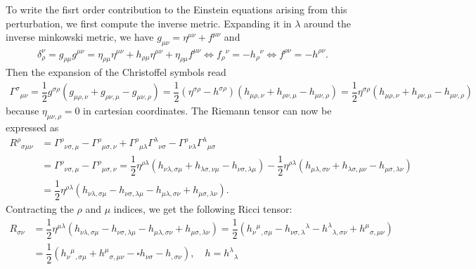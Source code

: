 \documentclass[10pt, a4paper]{article}
\begin{document}
{To write the fisrt order contribution to the Einstein equations arising from this perturbation, we first compute the inverse metric. Expanding it in $\lambda$ around the inverse minkowski metric, we have $g_{\mu\nu} = \eta^{\mu \nu} + f^{\mu \nu}$ and 
\begin{align*}
 \delta_{\rho}^{\nu} = g_{\rho \mu} g^{\mu\nu} = \eta_{\rho \mu}\eta^{\mu \nu} + h_{\rho \mu} \eta^{\mu \nu} + \eta_{\rho \mu} f^{\mu \nu} \iff f_\rho{}^{\nu} = -h_{\rho}{}^{\nu} \iff f^{\rho\nu} = -h^{\rho\nu}. 
\end{align*}
Then the expansion of the Christoffel symbols read
\begin{align*}
  \Gamma^{\sigma}{}_{\mu\nu} = \dfrac{1}{2}g^{\sigma \rho}(g_{\mu \rho, \nu}+g_{\rho \nu, \mu}-g_{\mu \nu, \rho}) = \dfrac{1}{2}(\eta^{\sigma \rho}-h^{\sigma \rho})(h_{\mu \rho, \nu}+h_{\rho \nu, \mu}-h_{\mu \nu, \rho}) = \dfrac{1}{2}\eta^{\sigma \rho}(h_{\mu \rho, \nu}+h_{\rho \nu, \mu}-h_{\mu \nu, \rho})
\end{align*}
because $\eta_{\mu\nu, \rho} = 0$ in cartesian coordinates. The Riemann tensor can now be expressed as 
\begin{align*}
  R^{\rho}{}_{\sigma\mu\nu} &= \Gamma^{\rho}{}_{\nu\sigma, \mu} - \Gamma^{\rho}{}_{\mu\sigma, \nu} + \Gamma^{\rho}{}_{\mu\lambda}\Gamma^{\lambda}{}_{\nu\sigma} - \Gamma^{\rho}{}_{\nu\lambda}\Gamma^{\lambda}{}_{\mu\sigma}\\ &= \Gamma^{\rho}{}_{\nu\sigma, \mu} - \Gamma^{\rho}{}_{\mu\sigma, \nu} = \dfrac{1}{2}\eta^{\rho \lambda}(h_{\nu \lambda, \sigma \mu}+h_{\lambda \sigma, \nu \mu}-h_{\nu \sigma, \lambda \mu}) - \dfrac{1}{2}\eta^{\rho \lambda}(h_{\mu \lambda, \sigma \nu}+h_{\lambda \sigma, \mu \nu}-h_{\mu \sigma, \lambda \nu})\\
  &= \dfrac{1}{2}\eta^{\rho \lambda}(h_{\nu \lambda, \sigma \mu}-h_{\nu \sigma, \lambda \mu} - h_{\mu \lambda, \sigma \nu} + h_{\mu \sigma, \lambda \nu}).
\end{align*}
Contracting the $\rho$ and $\mu$ indices, we get the following Ricci tensor:
\begin{align*}
  R_{\sigma \nu} &= \dfrac{1}{2}\eta^{\mu \lambda}(h_{\nu \lambda, \sigma \mu}-h_{\nu \sigma, \lambda \mu} - h_{\mu \lambda, \sigma \nu} + h_{\mu \sigma, \lambda \nu}) = \dfrac{1}{2}(h_{\nu}{}^{\mu}{}_{, \sigma \mu}-h_{\nu \sigma, \lambda}{}^{\lambda} - h^{\lambda}{}_{\lambda, \sigma \nu} + h^\mu{}_{\sigma, \mu \nu})\\
  &= \dfrac{1}{2}(h_{\nu}{}^{\mu}{}_{, \sigma \mu} + h^\mu{}_{\sigma, \mu \nu}-\square h_{\nu \sigma} - h_{, \sigma \nu} ), \quad h = h^{\lambda}{}_{\lambda} 

\end{align*}}
\end{document}
